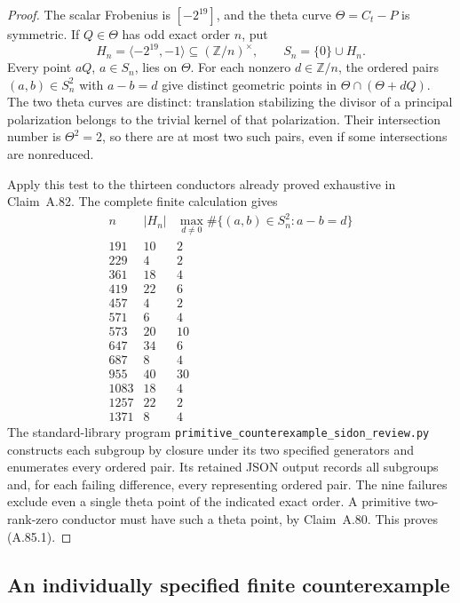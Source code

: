 \documentclass[11pt]{article}
\begin{document}
\begin{proof}
The scalar Frobenius is \([-2^{19}]\), and the theta curve
\(\Theta=C_t-P\) is symmetric. If \(Q\in\Theta\) has odd
exact order \(n\), put
\[
 H_n=\langle-2^{19},-1\rangle\subseteq(\mathbb Z/n)^\times,
 \qquad S_n=\{0\}\cup H_n.
\]
Every point \(aQ\), \(a\in S_n\), lies on \(\Theta\).
For each nonzero \(d\in\mathbb Z/n\), the ordered pairs
\((a,b)\in S_n^2\) with \(a-b=d\) give distinct geometric
points in \(\Theta\cap(\Theta+dQ)\). The two theta curves
are distinct: translation stabilizing the divisor of a principal
polarization belongs to the trivial kernel of that polarization.
Their intersection number is \(\Theta^2=2\), so there are at
most two such pairs, even if some intersections are nonreduced.

Apply this test to the thirteen conductors already proved exhaustive
in Claim~A.82. The complete finite calculation gives
\[
\begin{array}{r|r|r}
 n&|H_n|&\max_{d\ne0}\#\{(a,b)\in S_n^2:a-b=d\}\\\hline
 191&10&2\\229&4&2\\361&18&4\\419&22&6\\457&4&2\\
 571&6&4\\573&20&10\\647&34&6\\687&8&4\\955&40&30\\
 1083&18&4\\1257&22&2\\1371&8&4
\end{array}
\]
The standard-library program
\texttt{primitive\_counterexample\_sidon\_review.py}
constructs each subgroup by closure under its two specified generators
and enumerates every ordered pair. Its retained JSON output records
all subgroups and, for each failing difference, every representing
ordered pair. The nine failures exclude even a single theta point of
the indicated exact order. A primitive two-rank-zero conductor must
have such a theta point, by Claim~A.80. This proves (A.85.1).
\end{proof}


\subsection{An individually specified finite counterexample}
\end{document}
